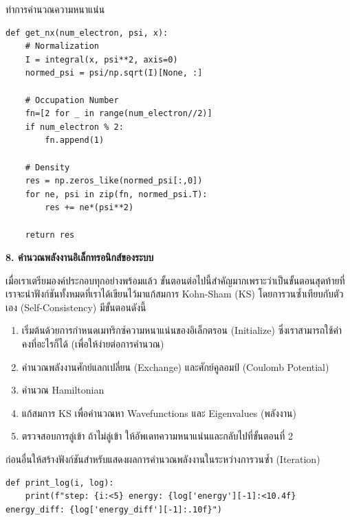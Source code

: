 \vspace{1em}
\noindent ทำการคำนวณความหนาแน่น

\begin{lstlisting}[style=MyPython]
def get_nx(num_electron, psi, x):
    # Normalization
    I = integral(x, psi**2, axis=0)
    normed_psi = psi/np.sqrt(I)[None, :]
    
    # Occupation Number
    fn=[2 for _ in range(num_electron//2)]
    if num_electron % 2:
        fn.append(1)

    # Density
    res = np.zeros_like(normed_psi[:,0])
    for ne, psi in zip(fn, normed_psi.T):
        res += ne*(psi**2)

    return res
\end{lstlisting}

\vspace{1em}
\noindent \textbf{8. คำนวณพลังงานอิเล็กทรอนิกส์ของระบบ}

เมื่อเราเตรียมองค์ประกอบทุกอย่างพร้อมแล้ว ขั้นตอนต่อไปนี้สำคัญมากเพราะว่าเป็นขั้นตอนสุดท้ายที่เราจะนำฟังก์ชันทั้งหมดที่เราได้เขียนไว้มาแก้สมการ
Kohn-Sham (KS) โดยการวนซ้ำเทียบกับตัวเอง (Self-Consistency) มีขั้นตอนดังนี้

\begin{enumerate}[topsep=0pt,noitemsep]
    \item เริ่มต้นด้วยการกำหนดเมทริกซ์ความหนาแน่นของอิเล็กตรอน (Initialize) ซึ่งเราสามารถใช้ค่าคงที่อะไรก็ได้ (เพื่อให้ง่ายต่อการคำนวณ)

    \item คำนวณพลังงานศักย์แลกเปลี่ยน (Exchange) และศักย์คูลอมป์ (Coulomb Potential)

    \item คำนวณ Hamiltonian

    \item แก้สมการ KS เพื่อคำนวณหา Wavefunctions และ Eigenvalues (พลังงาน)

    \item ตรวจสอบการลู่เข้า ถ้าไม่ลู่เข้า ให้อัพเดทความหนาแน่นและกลับไปที่ขั้นตอนที่ 2
\end{enumerate}

ก่อนอื่นให้สร้างฟังก์ชันสำหรับแสดงผลการคำนวณพลังงานในระหว่างการวนซ้ำ (Iteration)

\begin{lstlisting}[style=MyPython]
def print_log(i, log):
    print(f"step: {i:<5} energy: {log['energy'][-1]:<10.4f} energy_diff: {log['energy_diff'][-1]:.10f}")
\end{lstlisting}

\vspace{1em}

